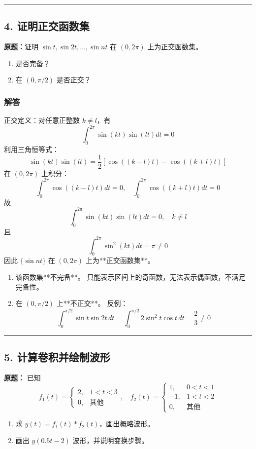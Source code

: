 \vspace{1em}
\hrule
\vspace{1em}

\subsection{4. 证明正交函数集}
\noindent\textbf{原题：}证明 $\sin t,\sin2t,\dots,\sin nt$ 在 $(0,2\pi)$ 上为正交函数集。
\begin{enumerate}
    \item 是否完备？
    \item 在 $(0,\pi/2)$ 是否正交？
\end{enumerate}

\subsubsection{解答}
正交定义：对任意正整数 $k\neq l$，有
\[
\int_{0}^{2\pi}\sin(kt)\sin(lt)dt=0
\]
利用三角恒等式：
\[
\sin(kt)\sin(lt)=\frac{1}{2}\left[\cos((k-l)t)-\cos((k+l)t)\right]
\]
在 $(0,2\pi)$ 上积分：
\[
\int_{0}^{2\pi}\cos((k-l)t)dt=0,\quad
\int_{0}^{2\pi}\cos((k+l)t)dt=0
\]
故
\[
\int_{0}^{2\pi}\sin(kt)\sin(lt)dt=0,\quad k\neq l
\]
且
\[
\int_{0}^{2\pi}\sin^2(kt)dt=\pi\neq0
\]
因此 $\{\sin nt\}$ 在 $(0,2\pi)$ 上为**正交函数集**。

\begin{enumerate}[label=(\arabic*)]
    \item 该函数集**不完备**。
    只能表示区间上的奇函数，无法表示偶函数，不满足完备性。

    \item 在 $(0,\pi/2)$ 上**不正交**。
    反例：
    \[
    \int_{0}^{\pi/2}\sin t\sin2t\,dt
    = \int_{0}^{\pi/2} 2\sin^2 t\cos t\,dt
    = \frac{2}{3}\neq0
    \]
\end{enumerate}

\vspace{1em}
\hrule
\vspace{1em}

\subsection{5. 计算卷积并绘制波形}
\noindent\textbf{原题：}
已知
\[
f_1(t)=
\begin{cases}
2,&1<t<3\\
0,&\text{其他}
\end{cases},\quad
f_2(t)=
\begin{cases}
1,&0<t<1\\
-1,&1<t<2\\
0,&\text{其他}
\end{cases}
\]
\begin{enumerate}[label=(\arabic*)]
    \item 求 $y(t)=f_1(t)*f_2(t)$，画出概略波形。
    \item 画出 $y(0.5t-2)$ 波形，并说明变换步骤。
\end{enumerate}

